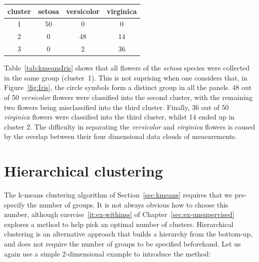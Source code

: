 \begin{center}
  \begin{tabular}{c|ccc}
    cluster & setosa & versicolor & virginica \\ \hline
    1 & 50 & 0 & 0 \\
    2 & 0 & 48 & 14 \\
    3 & 0 & 2 & 36 
  \end{tabular}
  \label{tab:kmeansIris}
\end{center}

Table~\ref{tab:kmeansIris} shows that all flowers of the \emph{setosa}
species were collected in the same group (cluster~1). This is not
suprising when one considers that, in Figure~\ref{fig:Iris}, the
circle symbols form a distinct group in all the panels. 48 out of 50
\emph{versicolor} flowers were classified into the second cluster,
with the remaining two flowers being misclassified into the third
cluster. Finally, 36 out of 50 \emph{virginica} flowers were
classified into the third cluster, whilst 14 ended up in cluster 2.
The difficulty in separating the \emph{versicolor} and
\emph{virginica} flowers is caused by the overlap between their four
dimensional data clouds of measurements.

\section{Hierarchical clustering}
\label{sec:hierarchical}

The k-means clustering algorithm of Section~\ref{sec:kmeans} requires
that we pre-specify the number of groups.  It is not always obvious
how to choose this number, although exercise~\ref{it:ex-withinss} of
Chapter~\ref{sec:ex-unsupervised} explores a method to help pick an
optimal number of clusters.  Hierarchical clustering is an alternative
approach that builds a hierarchy from the bottom-up, and does not
require the number of groups to be specified beforehand. Let us again
use a simple 2-dimensional example to introduce the method:

